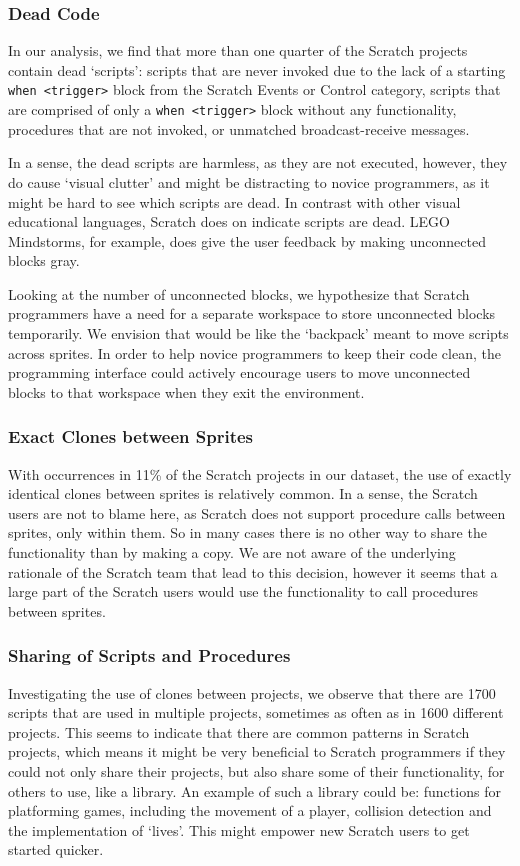 \documentclass{sig-alternate}
\begin{document}
\subsubsection{Dead Code}
In our analysis, we find that more than one quarter of the Scratch projects contain dead `scripts': scripts that are never invoked due to the lack of a starting \texttt{when <trigger>} block from the Scratch Events or Control category, scripts that are comprised of only a \texttt{when <trigger>} block without any functionality, procedures that are not invoked, or unmatched broadcast-receive messages.

In a sense, the dead scripts are harmless, as they are not executed, however, they do cause `visual clutter' and might be distracting to novice programmers, as it might be hard to see which scripts are dead. In contrast with other visual educational languages, Scratch does on indicate scripts are dead. LEGO Mindstorms, for example, does give the user feedback by making unconnected blocks gray. 

Looking at the number of unconnected blocks, we hypothesize that Scratch programmers have a need for a separate workspace to store unconnected blocks temporarily. We envision that would be like the `backpack' meant to move scripts across sprites. In order to help novice programmers to keep their code clean, the programming interface could  actively encourage users to move unconnected blocks to that workspace when they exit the environment.

\subsubsection{Exact Clones between Sprites}
With occurrences in 11\% of the Scratch projects in our dataset, the use of exactly identical clones between sprites is relatively common. In a sense, the Scratch users are not to blame here, as Scratch does not support procedure calls between sprites, only within them. So in many cases there is no other way to share the functionality than by making a copy. We are not aware of the underlying rationale of the Scratch team that lead to this decision, however it seems that a large part of the Scratch users would use the functionality to call procedures between sprites.

\subsubsection{Sharing of Scripts and Procedures}
Investigating the use of clones between projects, we observe that there are 1700 scripts that are used in multiple projects, sometimes as often as in 1600 different projects. This seems to indicate that there are common patterns in Scratch projects, which means it might be very beneficial to Scratch programmers if they could not only share their projects, but also share some of their functionality, for others to use, like a library. An example of such a library could be: functions for platforming games, including the movement of a player, collision detection and the implementation of `lives'. This might empower new Scratch users to get started quicker.
\end{document}

